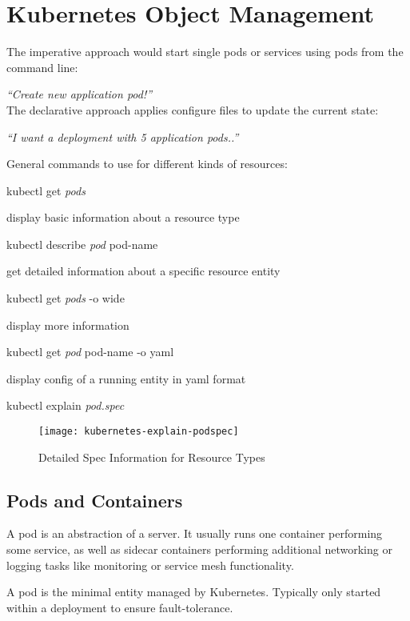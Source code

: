 \section{Kubernetes Object Management}
The imperative approach would start single pods or services using pods from the command line:

\emph{``Create new application pod!''} \\
The declarative approach applies configure files to update the current state:

\emph{``I want a deployment with 5 application pods..''}

\vspace{3mm}
\noindent
General commands to use for different kinds of resources:

\vspace{3mm}
\ttfamily
\noindent
kubectl get \emph{pods}\rmfamily

display basic information about a resource type

\ttfamily
\noindent
kubectl describe \emph{pod} pod-name\rmfamily

get detailed information about a specific resource entity

\ttfamily
\noindent
kubectl get \emph{pods} -o wide \rmfamily

display more information

\ttfamily
\noindent
kubectl get \emph{pod} pod-name -o yaml \rmfamily

display config of a running entity in yaml format

\ttfamily
\noindent
kubectl explain \emph{pod.spec}\rmfamily

\begin{figure}[h]
    \centering
    \texttt{[image: kubernetes-explain-podspec]}
    \caption{Detailed Spec Information for Resource Types}
\end{figure}

\subsection{Pods and Containers}
A pod is an abstraction of a server. It usually runs one container performing some service, as well as sidecar containers 
performing additional networking or logging tasks like monitoring or service mesh functionality.

A pod is the minimal entity managed by Kubernetes. Typically only started within a deployment to ensure fault-tolerance.

